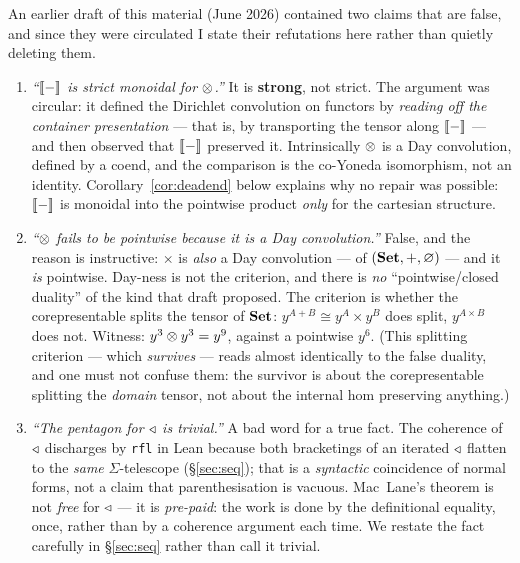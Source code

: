An earlier draft of this material (June 2026) contained two claims that are
false, and since they were circulated I state their refutations here rather than
quietly deleting them.

\begin{enumerate}
\item \emph{``$\llbracket - \rrbracket$ is strict monoidal for $\mathbin{\otimes}$.''} It is
  \textbf{strong}, not strict. The argument was circular: it defined the
  Dirichlet convolution on functors by \emph{reading off the container
  presentation} --- that is, by transporting the tensor along $\llbracket - \rrbracket$ --- and
  then observed that $\llbracket - \rrbracket$ preserved it. Intrinsically $\mathbin{\otimes}$ is a Day
  convolution, defined by a coend, and the comparison is the co-Yoneda
  isomorphism, not an identity. Corollary~\ref{cor:deadend} below explains why
  no repair was possible: $\llbracket - \rrbracket$ is monoidal into the pointwise product
  \emph{only} for the cartesian structure.

\item \emph{``$\mathbin{\otimes}$ fails to be pointwise \emph{because} it is a Day
  convolution.''} False, and the reason is instructive: $\times$ is
  \emph{also} a Day convolution --- of $(\mathbf{Set},+,\varnothing)$ --- and it
  \emph{is} pointwise. Day-ness is not the criterion, and there is \emph{no}
  ``pointwise/closed duality'' of the kind that draft proposed. The criterion is
  whether the corepresentable splits the tensor of $\mathbf{Set}$: $y^{A+B}\cong
  y^A\times y^B$ does split, $y^{A\times B}$ does not. Witness: $y^3\mathbin{\otimes} y^3=y^9$,
  against a pointwise $y^6$. (This splitting criterion --- which \emph{survives}
  --- reads almost identically to the false duality, and one must not confuse
  them: the survivor is about the corepresentable splitting the \emph{domain}
  tensor, not about the internal hom preserving anything.)

\item \emph{``The pentagon for $\mathbin{\triangleleft}$ is trivial.''} A bad word for a true fact.
  The coherence of $\mathbin{\triangleleft}$ discharges by \texttt{rfl} in Lean because both
  bracketings of an iterated $\mathbin{\triangleleft}$ flatten to the \emph{same}
  $\Sigma$-telescope (§\ref{sec:seq}); that is a \emph{syntactic} coincidence of
  normal forms, not a claim that parenthesisation is vacuous. Mac~Lane's theorem
  is not \emph{free} for $\mathbin{\triangleleft}$ --- it is \emph{pre-paid}: the work is done by the
  definitional equality, once, rather than by a coherence argument each time. We
  restate the fact carefully in §\ref{sec:seq} rather than call it trivial.
\end{enumerate}

